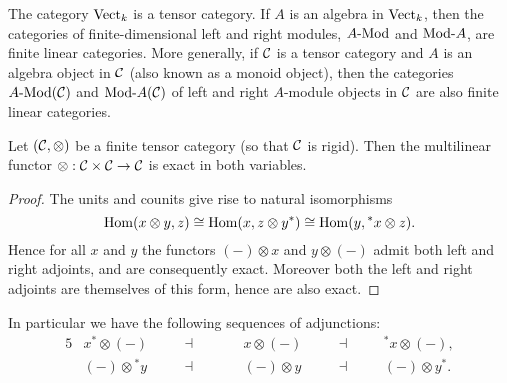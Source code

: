 \documentclass{amsart}
\begin{document}
\begin{example}
	The category $\mathrm{Vect}_k$ is a tensor category. If $A$ is an algebra in $\mathrm{Vect}_k$, then the categories of finite-dimensional left and right modules, $\Mod{A}{}$ and $\Mod{}{A}$, are finite linear categories. More generally, if $\mathcal C$ is a tensor category and $A$ is an algebra object in $\mathcal C$ (also known as a monoid object), then the categories $\Mod{A}{}(\cC)$ and $\Mod{}{A}(\cC)$ of left and right $A$-module objects in $\mathcal C$ are also finite linear categories.
\end{example}


\begin{lemma} \cite[2.1.8]{MR1797619} \cite[Prop. 1.13.1]{EGNO}  \label{lma:RigidIsExact}
	Let $(\mathcal C, \otimes)$ be a finite tensor category (so that $\mathcal C$ is rigid). Then the multilinear functor $\otimes: \mathcal C \times \mathcal C \to \mathcal C$ is exact in both variables. 
\end{lemma}

\begin{proof}
	The units and counits give rise to natural isomorphisms
 \begin{equation*} 
 	\operatorname{Hom}(x \otimes y, z) \cong \operatorname{Hom}( x, z \otimes y^*) \cong \operatorname{Hom}(y, {}^*x \otimes z).
 \end{equation*}
	Hence for all $x$ and $y$ the functors $(-)\otimes x$ and $y \otimes (-)$ admit both left and right adjoints, and are consequently exact. Moreover both the left and right adjoints are themselves of this form, hence are also  exact. 
\end{proof}

\noindent In particular we have the following sequences of adjunctions:
\begin{alignat*}{5}
	& x^* \otimes (-)  \quad & &  \dashv \quad &&  \quad x \otimes (-)  \quad &&  \dashv &&  \quad {}^*x \otimes (-), \\
	& (-) \otimes {}^* y  \quad & &  \dashv \quad &&  \quad (-) \otimes y  \quad &&  \dashv &&  \quad (-) \otimes y^*. 
\end{alignat*}
\end{document}
